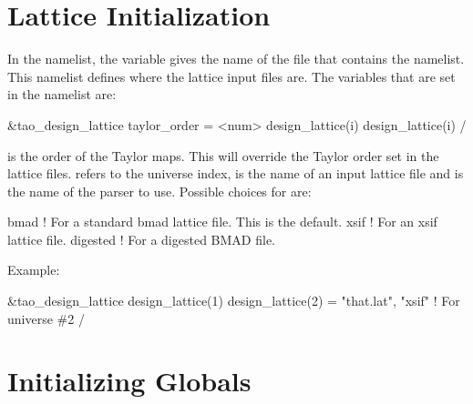 {%
\section{Lattice Initialization}
\label{s:init_lat} 

In the  namelist, the  variable gives
the name of the file that contains the 
namelist. This namelist defines where the lattice input files are. The
variables that are set in the  namelist are:
\begin{example}
  &tao_design_lattice
    taylor_order = <num>
    design_lattice(i)%
    design_lattice(i)%
  /
\end{example}
 is the order of the Taylor maps. This will override
the Taylor order set in the lattice files.  refers to the
universe index,  is the name of an input lattice
file and  is the name of the parser to use. Possible
choices for  are:
\begin{example}
  bmad      ! For a standard bmad lattice file. This is the default.
  xsif      ! For an xsif lattice file.
  digested  ! For a digested BMAD file.
\end{example}

Example:
\begin{example}
  &tao_design_lattice
    design_lattice(1)%
    design_lattice(2)      = "that.lat", "xsif"  ! For universe \#2
  /
\end{example}

\section{Initializing Globals}
\label{s:globals} 

}
